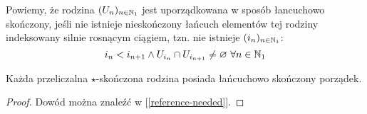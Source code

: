 \begin{df}
  Powiemy, że rodzina $(U_n)_{n\in{\mathbb{N}_1}}$ jest uporządkowana w sposób łancuchowo skończony, jeśli nie istnieje nieskończony łańcuch elementów tej rodziny indeksowany silnie rosnącym ciągiem, tzn. nie istnieje $(i_n)_{n\in{\mathbb{N}_1}}$:
  \[
    i_n < i_{n+1} \wedge U_{i_n} \cap U_{i_{n+1}} \neq \varnothing\ \forall n\in{\mathbb{N}_1}
  \]
\end{df}

\begin{lem} \label{lem:chain-finite-order}
  Każda przeliczalna $\star$-skończona rodzina posiada łańcuchowo skończony porządek.
  \begin{proof}
    Dowód można znaleźć w [\ref{reference-needed}].
  \end{proof}
\end{lem}
